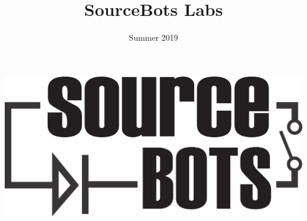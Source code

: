 \documentclass[a4paper,10pt]{article}
\title{{\myfont SourceBots Labs}}
\date{Summer 2019}
\begin{document}
  \begin{titlepage}
    \maketitle
    \begin{center}
      \includegraphics[width=\textwidth]{img/SourceBots.png}      
    \end{center}
  \end{titlepage}
  
  
  
  
  
  
  
\end{document}
